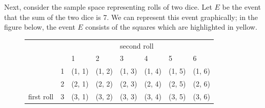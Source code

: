 \documentclass[12pt]{article}
\theoremstyle{definition}
\theoremstyle{remark}
\begin{document}
Next, consider the sample space representing rolls of two dice. Let $E$ be the event that the sum of the two dice is 7. We can represent this event graphically; in the figure below, the event $E$ consists of the squares which are highlighted in yellow.

\begin{figure}[H]
\centering
\label{two-dice-sum-seven}
\begin{tabular}{llllllll}
           &                        &                                                     &                                                     & \multicolumn{2}{l}{second roll}                                                                           &                                                     &                                                     \\
           &                        & 1                                                   & 2                                                   & 3                                                   & 4                                                   & 5                                                   & 6                                                   \\ \cline{3-8} 
           & \multicolumn{1}{l|}{1} & (1, 1)                                              & (1, 2)                                              & (1, 3)                                              & (1, 4)                                              & \multicolumn{1}{l|}{(1, 5)}                         & \multicolumn{1}{l|}{\cellcolor[HTML]{F8FF00}(1, 6)} \\ \cline{7-8} 
           & \multicolumn{1}{l|}{2} & (2, 1)                                              & (2, 2)                                              & (2, 3)                                              & \multicolumn{1}{l|}{(2, 4)}                         & \multicolumn{1}{l|}{\cellcolor[HTML]{F8FF00}(2, 5)} & \multicolumn{1}{l|}{(2, 6)}                         \\ \cline{6-7}
first roll & \multicolumn{1}{l|}{3} & (3, 1)                                              & (3, 2)                                              & \multicolumn{1}{l|}{(3, 3)}                         & \multicolumn{1}{l|}{\cellcolor[HTML]{F8FF00}(3, 4)} & (3, 5)                                              & \multicolumn{1}{l|}{(3, 6)}                         \\ \cline{5-6}

\end{tabular}
\end{figure}
\end{document}
